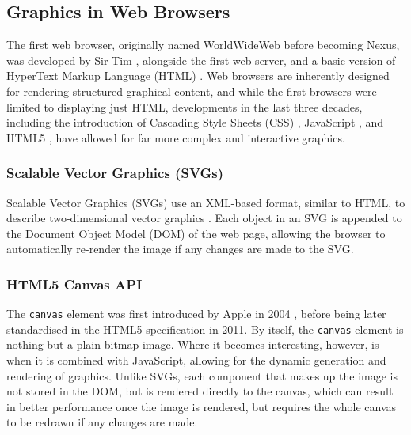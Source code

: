 \documentclass[../main.tex]{subfiles}
\begin{document}
        \subsection{Graphics in Web Browsers}
            The first web browser, originally named WorldWideWeb before becoming Nexus, was
                developed by Sir Tim \citet{worldWideWeb}, alongside the first web server, and
                a basic version of HyperText Markup Language (HTML) \citep{html}.
            Web browsers are inherently designed for rendering structured graphical
                content, and while the first browsers were limited to displaying just HTML,
                developments in the last three decades, including the introduction of Cascading
                Style Sheets (CSS) \citep{css}, JavaScript \citep{js}, and HTML5 \citep{html5},
                have allowed for far more complex and interactive graphics.

            \subsubsection{Scalable Vector Graphics (SVGs)}
                Scalable Vector Graphics (SVGs) use an XML-based format, similar to HTML, to
                    describe two-dimensional vector graphics \citep{svg}.
                Each object in an SVG is appended to the Document Object Model (DOM) of the web
                    page, allowing the browser to automatically re-render the image if any changes
                    are made to the SVG.

            \subsubsection{HTML5 Canvas API}
                The \texttt{canvas} element was first introduced by Apple in 2004
                    \citep{appleCanvas}, before being later standardised in the HTML5 specification
                    \citep{html5Canvas} in 2011.
                By itself, the \texttt{canvas} element is nothing but a plain bitmap image.
                Where it becomes interesting, however, is when it is combined with JavaScript,
                    allowing for the dynamic generation and rendering of graphics.
                Unlike SVGs, each component that makes up the image is not stored in the DOM,
                    but is rendered directly to the canvas, which can result in better performance
                    once the image is rendered, but requires the whole canvas to be redrawn if any
                    changes are made.
\end{document}
